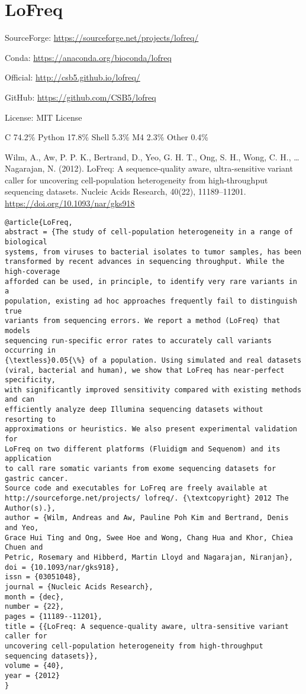 \documentclass[]{article}
\begin{document}
\section{LoFreq}

SourceForge: \url{https://sourceforge.net/projects/lofreq/}

Conda: \url{https://anaconda.org/bioconda/lofreq}

Official: \url{http://csb5.github.io/lofreq/}

GitHub: \url{https://github.com/CSB5/lofreq}

License: MIT License


C 74.2\% Python 17.8\% Shell 5.3\% M4 2.3\% Other 0.4\%

Wilm, A., Aw, P. P. K., Bertrand, D., Yeo, G. H. T., Ong, S. H., Wong, C. H., … Nagarajan, N. (2012). LoFreq: A sequence-quality aware, ultra-sensitive variant caller for uncovering cell-population heterogeneity from high-throughput sequencing datasets. Nucleic Acids Research, 40(22), 11189–11201. \url{https://doi.org/10.1093/nar/gks918}

\begin{verbatim}
@article{LoFreq,
abstract = {The study of cell-population heterogeneity in a range of biological
systems, from viruses to bacterial isolates to tumor samples, has been
transformed by recent advances in sequencing throughput. While the high-coverage
afforded can be used, in principle, to identify very rare variants in a
population, existing ad hoc approaches frequently fail to distinguish true
variants from sequencing errors. We report a method (LoFreq) that models
sequencing run-specific error rates to accurately call variants occurring in
{\textless}0.05{\%} of a population. Using simulated and real datasets
(viral, bacterial and human), we show that LoFreq has near-perfect specificity,
with significantly improved sensitivity compared with existing methods and can
efficiently analyze deep Illumina sequencing datasets without resorting to
approximations or heuristics. We also present experimental validation for
LoFreq on two different platforms (Fluidigm and Sequenom) and its application
to call rare somatic variants from exome sequencing datasets for gastric cancer.
Source code and executables for LoFreq are freely available at
http://sourceforge.net/projects/ lofreq/. {\textcopyright} 2012 The Author(s).},
author = {Wilm, Andreas and Aw, Pauline Poh Kim and Bertrand, Denis and Yeo,
Grace Hui Ting and Ong, Swee Hoe and Wong, Chang Hua and Khor, Chiea Chuen and
Petric, Rosemary and Hibberd, Martin Lloyd and Nagarajan, Niranjan},
doi = {10.1093/nar/gks918},
issn = {03051048},
journal = {Nucleic Acids Research},
month = {dec},
number = {22},
pages = {11189--11201},
title = {{LoFreq: A sequence-quality aware, ultra-sensitive variant caller for
uncovering cell-population heterogeneity from high-throughput sequencing datasets}},
volume = {40},
year = {2012}
}
\end{verbatim}
\end{document}

